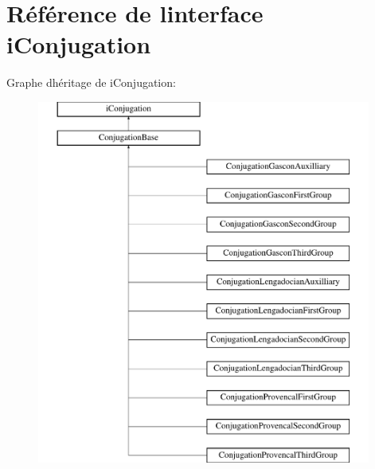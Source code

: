 \hypertarget{interfaceiConjugation}{}\section{Référence de l\textquotesingle{}interface i\+Conjugation}
\label{interfaceiConjugation}
Graphe d\textquotesingle{}héritage de i\+Conjugation\+:\begin{figure}[H]
\begin{center}
\leavevmode
\includegraphics[height=12.000000cm]{interfaceiConjugation}
\end{center}
\end{figure}
